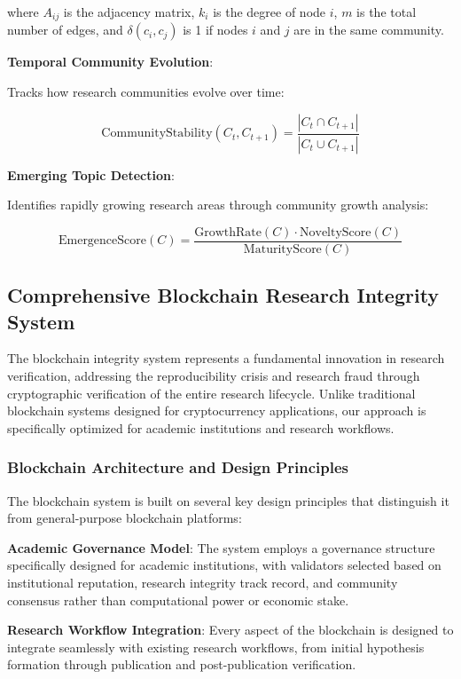 \documentclass[10pt,twocolumn]{article}
\begin{document}
where $A_{ij}$ is the adjacency matrix, $k_i$ is the degree of node $i$, $m$ is the total number of edges, and $\delta(c_i, c_j)$ is 1 if nodes $i$ and $j$ are in the same community.

\textbf{Temporal Community Evolution}:

Tracks how research communities evolve over time:

\begin{equation}
\text{CommunityStability}(C_t, C_{t+1}) = \frac{|C_t \cap C_{t+1}|}{|C_t \cup C_{t+1}|}
\end{equation}

\textbf{Emerging Topic Detection}:

Identifies rapidly growing research areas through community growth analysis:

\begin{equation}
\text{EmergenceScore}(C) = \frac{\text{GrowthRate}(C) \cdot \text{NoveltyScore}(C)}{\text{MaturityScore}(C)}
\end{equation}

\subsection{Comprehensive Blockchain Research Integrity System}

The blockchain integrity system represents a fundamental innovation in research verification, addressing the reproducibility crisis and research fraud through cryptographic verification of the entire research lifecycle. Unlike traditional blockchain systems designed for cryptocurrency applications, our approach is specifically optimized for academic institutions and research workflows.

\subsubsection{Blockchain Architecture and Design Principles}

The blockchain system is built on several key design principles that distinguish it from general-purpose blockchain platforms:

\textbf{Academic Governance Model}: The system employs a governance structure specifically designed for academic institutions, with validators selected based on institutional reputation, research integrity track record, and community consensus rather than computational power or economic stake.

\textbf{Research Workflow Integration}: Every aspect of the blockchain is designed to integrate seamlessly with existing research workflows, from initial hypothesis formation through publication and post-publication verification.
\end{document}
